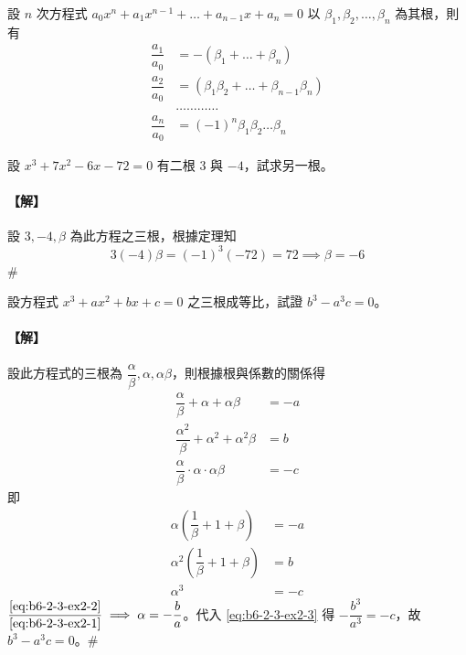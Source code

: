 \begin{theorem}\label{thm:b6-2-vieta}
設 $n$ 次方程式 $a_0 x^n + a_1 x^{n-1} + \dots + a_{n-1} x + a_n = 0$ 以 $\beta_1, \beta_2, \dots, \beta_n$ 為其根，則有
\begin{equation}
\begin{aligned}
\dfrac{a_1}{a_0} &= -(\beta_1+\dots+\beta_n) \\
\dfrac{a_2}{a_0} &= (\beta_1\beta_2+\dots+\beta_{n-1}\beta_n) \\
&\dots\dots\dots\dots \\
\dfrac{a_n}{a_0} &= (-1)^n \beta_1\beta_2\dots\beta_n
\end{aligned} \tag{II} \label{eq:b6-2-3-II}
\end{equation}
\end{theorem}

\begin{example}\label{ex:b6-2-8}
設 $x^3+7x^2-6x-72=0$ 有二根 3 與 $-4$，試求另一根。
\end{example}

\paragraph{【解】}
設 $3, -4, \beta$ 為此方程之三根，根據定理知
\[ 3(-4)\beta = (-1)^3(-72) = 72 \implies \beta = -6 \]\hfill$\#$

\begin{example}\label{ex:b6-2-9}
設方程式 $x^3+ax^2+bx+c=0$ 之三根成等比，試證 $b^3-a^3c=0$。
\end{example}

\paragraph{【解】}
設此方程式的三根為 $\dfrac{\alpha}{\beta}, \alpha, \alpha\beta$，則根據根與係數的關係得
\begin{align*}
\dfrac{\alpha}{\beta} + \alpha + \alpha\beta &= -a \\
\dfrac{\alpha^2}{\beta} + \alpha^2 + \alpha^2\beta &= b \\
\dfrac{\alpha}{\beta} \cdot \alpha \cdot \alpha\beta &= -c
\end{align*}
即
\begin{align}
\alpha\left(\dfrac{1}{\beta}+1+\beta\right) &= -a \label{eq:b6-2-3-ex2-1} \\
\alpha^2\left(\dfrac{1}{\beta}+1+\beta\right) &= b \label{eq:b6-2-3-ex2-2} \\
\alpha^3 &= -c \label{eq:b6-2-3-ex2-3}
\end{align}
$\dfrac{\eqref{eq:b6-2-3-ex2-2}}{\eqref{eq:b6-2-3-ex2-1}} \implies \alpha = -\dfrac{b}{a}$。代入 \eqref{eq:b6-2-3-ex2-3} 得 $-\dfrac{b^3}{a^3} = -c$，故 $b^3 - a^3 c = 0$。\hfill$\#$

